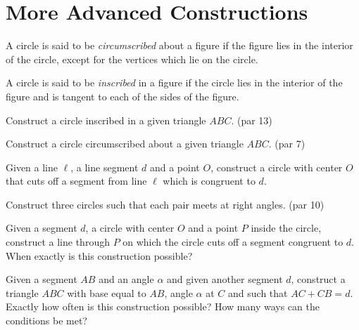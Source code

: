 \chapter{More Advanced Constructions}

\begin{definition}\label{defn:circumscribed}
A circle is said to be \emph{circumscribed} about a figure if the figure lies in the interior of the circle, except for the vertices which lie on the circle.
\end{definition}

\begin{definition}A circle is said to be \emph{inscribed} in a figure if the circle lies in the interior of the figure and is tangent to each of the sides of the figure.
\end{definition}

\begin{challenge}\label{chal:triangle-inscribe-circle}
Construct a circle inscribed in a given triangle $ABC$. (par 13)
\end{challenge}

\begin{challenge}\label{chal:triangle-circumscribe-circle}
Construct a circle circumscribed about a given triangle $ABC$. (par 7)
\end{challenge}



\begin{challenge}\label{chal:cut-segment-by-circle}
Given a line $\ell$, a line segment $d$ and a point $O$, construct a circle with center $O$ that cuts off a segment from line $\ell$ which is congruent to $d$.
\end{challenge}



\begin{challenge}\label{chal:three-perp-circles}
Construct three circles such that each pair meets at right angles. (par 10)
\end{challenge}

\begin{challenge}\label{chal:cut-circle-by-segment}
Given a segment $d$, a circle with center $O$ and a point $P$ inside the circle, construct a line through $P$ on which the circle cuts off a segment congruent to $d$.
When exactly is this construction possible?
\end{challenge}


\begin{challenge}\label{chal:triangle-problem}
Given a segment $AB$ and an angle $\alpha$ and given another segment $d$, construct a triangle $ABC$ with base equal to $AB$, angle $\alpha$ at $C$ and such that $AC + CB = d$.
Exactly how often is this construction possible? How many ways can the conditions be met?
\end{challenge}


